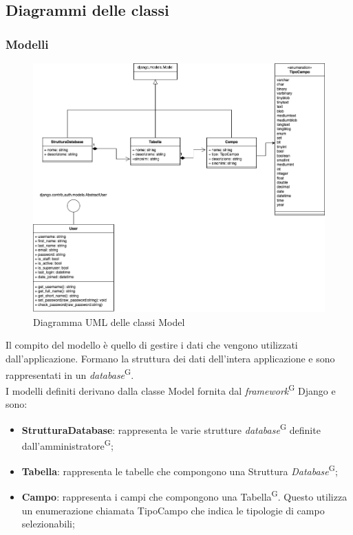 \documentclass[5pt]{article}
\begin{document}
	\subsection{Diagrammi delle classi}
	
	\subsubsection{Modelli}
	
	\begin{figure}[H]
		\includegraphics[scale=0.55]{UML_classes/models.png}
		\caption{Diagramma UML delle classi Model}
		\centering
	\end{figure}	
	
	Il compito del modello è quello di gestire i dati che vengono utilizzati dall'applicazione. Formano la struttura dei dati dell'intera applicazione e sono rappresentati in un \textit{database}\textsuperscript{G}.\\
	
	I modelli definiti derivano dalla classe Model fornita dal \textit{framework}\textsuperscript{G} Django e sono:
	\begin{itemize}
		\item \textbf{StrutturaDatabase}: rappresenta le varie strutture \textit{database}\textsuperscript{G} definite dall'amministratore\textsuperscript{G};
		\item \textbf{Tabella}: rappresenta le tabelle che compongono una Struttura \textit{Database}\textsuperscript{G};
		\item \textbf{Campo}: rappresenta i campi che compongono una Tabella\textsuperscript{G}. Questo utilizza un enumerazione chiamata TipoCampo che indica le tipologie di campo selezionabili;
	\end{itemize}
	
\end{document}
